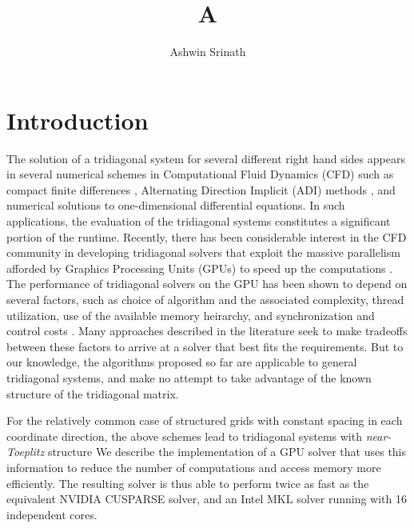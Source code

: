 \documentclass{elsarticle}
\begin{document}
\begin{frontmatter}
\author{Ashwin Srinath}
\title{A}
\maketitle

\begin{abstract}

\end{abstract}

\end{frontmatter}

    
\section{Introduction}

The solution of a tridiagonal system
for several different right hand sides
appears in several numerical schemes
in Computational Fluid Dynamics (CFD)
such as
compact finite differences \cite{lele1992compact},
Alternating Direction Implicit (ADI) methods \cite{1955ADI}, and
numerical solutions to one-dimensional differential equations.
In such applications,
the evaluation of the tridiagonal systems constitutes
a significant portion of the runtime.
Recently, there has been considerable interest in the CFD community
in developing tridiagonal solvers that
exploit the massive parallelism afforded by
Graphics Processing Units (GPUs)
to speed up the computations
\cite{tutkun2012gpu}
\cite{esfahanian2014efficient}
\cite{GoSt11CR}.
The performance of tridiagonal solvers on the GPU
has been shown to depend on several factors,
such as
choice of algorithm and the associated complexity,
thread utilization,
use of the available memory heirarchy,
and synchronization and control costs
\cite{Zhang2010FTS}.
Many approaches described in the literature
seek to make tradeoffs between these factors
to arrive at a solver that best fits the requirements.
But to our knowledge,
the algorithms proposed so far
are applicable to general tridiagonal systems,
and make no attempt to take advantage of
the known structure of the tridiagonal matrix.

For the relatively common case of structured grids
with constant spacing in each coordinate direction,
the above schemes lead to tridiagonal systems with
\emph{near-Toeplitz} structure
We describe the implementation of a GPU solver that
uses this information to
reduce the number of computations
and access memory more efficiently.
The resulting solver is thus able to perform twice as fast as
the equivalent NVIDIA CUSPARSE solver,
and an Intel MKL solver running with 16 independent cores.
\end{document}
